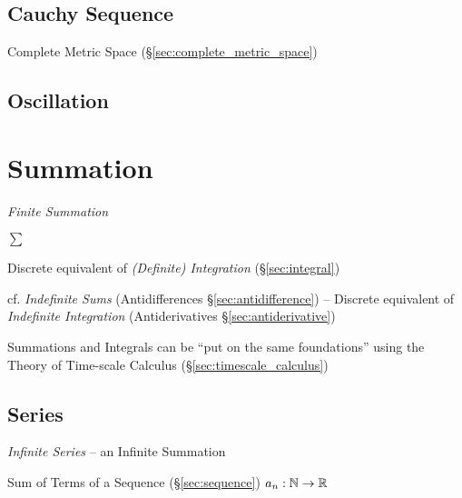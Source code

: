 \subsection{Cauchy Sequence}\label{sec:cauchy_sequence}

Complete Metric Space (\S\ref{sec:complete_metric_space})



\subsection{Oscillation}\label{sec:oscillation}



\section{Summation}\label{sec:summation}

\emph{Finite Summation}

$\sum$

Discrete equivalent of \emph{(Definite) Integration} (\S\ref{sec:integral})

\fist cf. \emph{Indefinite Sums} (Antidifferences \S\ref{sec:antidifference}) --
Discrete equivalent of \emph{Indefinite Integration} (Antiderivatives
\S\ref{sec:antiderivative})

Summations and Integrals can be ``put on the same foundations'' using the Theory
of Time-scale Calculus (\S\ref{sec:timescale_calculus})



\subsection{Series}\label{sec:series}

\emph{Infinite Series} -- an Infinite Summation

Sum of Terms of a Sequence (\S\ref{sec:sequence}) $a_n : \mathbb{N}
\rightarrow \mathbb{R}$

